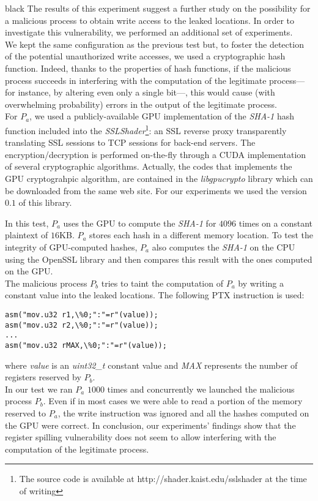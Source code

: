 \documentclass[11pt,onecolumn,letterpaper]{IEEEtran}
\newcommand{\clr}{black}
\begin{document}
\begin{color}{\clr}
\label{writingbug} 
The results of this experiment suggest a further study 
on the possibility for a malicious process to obtain write access to the leaked locations. 
In order to investigate this vulnerability, we performed an additional set of experiments. \\
We kept the same configuration as the previous test but, 
to foster the detection of the potential unauthorized write accesses, we used a cryptographic hash function. 
Indeed, thanks to the properties of hash functions, if the malicious process succeeds in interfering with the computation of the legitimate process---for instance,  
by altering even only a single bit---, this would cause (with overwhelming probability) errors in the output of the legitimate process. \\
For $P_a$, we used a publicly-available GPU implementation of the \emph{SHA-1} hash function included into the 
\emph{SSLShader}\footnote{The source code is available at http://shader.kaist.edu/sslshader at the time of writing}:
an SSL reverse proxy transparently translating SSL sessions to TCP sessions for back-end servers.  
The encryption/decryption is performed on-the-fly through a CUDA implementation of several cryptographic algorithms. 
Actually, the codes that implements the GPU cryptograhpic algorithm, are contained in the \emph{libgpucrypto} library which can be downloaded from the same web site. 
For our experiments we used the version $0.1$ of this library. 

In this test, $P_a$ uses the GPU to compute the \emph{SHA-1} for $4096$ times on a constant plaintext of $16$KB. 
$P_a$ stores each hash in a different memory location. 
To test the integrity of GPU-computed hashes, $P_a$ also computes the \emph{SHA-1} on the CPU using the OpenSSL library 
and then compares this result with the ones computed on the GPU. \\
The malicious process $P_b$ tries to taint the computation of $P_a$ by writing a constant value into the leaked locations. 
The following PTX instruction is used:\\

\begin{Verbatim}[frame=single]
asm("mov.u32 r1,\%0;":"=r"(value));
asm("mov.u32 r2,\%0;":"=r"(value));
...
asm("mov.u32 rMAX,\%0;":"=r"(value));
\end{Verbatim}

where \emph{value} is an \emph{uint32\_t} constant value and \emph{MAX} represents the number of registers reserved by $P_b$.\\
In our test we ran $P_a$ $1000$ times and concurrently we launched the malicious process $P_b$. 
Even if in most cases we were able to read a portion of the memory reserved to $P_a$, 
the write instruction was ignored and all the hashes computed on the GPU were correct. 
In conclusion, our experiments' findings show that the register spilling vulnerability does not seem to allow interfering with the computation of the legitimate process.\\  
\end{color}
\end{document}
